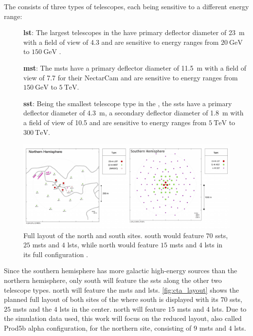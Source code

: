 The \cta{} consists of three types of telescopes, each being sensitive to a different energy range:
\begin{description}
    \item [] \textbf{\gls{lst}}: The largest telescopes in the \cta{} have primary deflector diameter
    of \SI{23}{\meter} with a field of view of \SI{4.3}{\deg} and are sensitive to energy
    ranges from \(\SI{20}{\giga\eV}\) to \(\SI{150}{\giga\eV}\) \cite{cta_specs}.
    \item [] \textbf{\gls{mst}}: The \glspl{mst} have a primary deflector diameter of \SI{11.5}{\meter}
    with a field of view of \SI{7.7}{\deg} for their NectarCam and are sensitive to energy ranges
    from \(\SI{150}{\giga\eV}\) to \(\SI{5}{\tera\eV}\).
    \item [] \textbf{\gls{sst}}: Being the smallest telescope type in the \cta{}, the \glspl{sst}
    have a primary deflector diameter of \SI{4.3}{\meter}, a secondary deflector diameter of
    \SI{1.8}{\meter} with a field of view of \SI{10.5}{\deg} and are sensitive to energy ranges
    from \(\SI{5}{\tera\eV}\) to \(\SI{300}{\tera\eV}\).
\end{description}

\begin{figure}
    \centering
    \includegraphics[width=\textwidth]{graphics/cta_layout.png}
    \caption{Full layout of the \cta{} north and south sites. \cta{} south would feature
    \(\num{70}\) \glspl{sst}, \(\num{25}\) \glspl{mst} and \(\num{4}\) \glspl{lst}, while
    \cta{} north would feature \(\num{15}\) \glspl{mst} and \(\num{4}\) \glspl{lst} in its
    full configuration \cite{cta_layout}.}
    \label{fig:cta_layout}
\end{figure}

Since the southern hemisphere has more galactic high-energy sources than the northern hemisphere,
only \cta{} south will feature the \glspl{sst} along the other two telescope types. \cta{} north
will feature the \glspl{mst} and \glspl{lst}. \autoref{fig:cta_layout} shows the
planned full layout of both sites of the \cta{} where \cta{} south is displayed with its \(\num{70}\)
\glspl{sst}, \(\num{25}\) \glspl{mst} and the \(\num{4}\) \glspl{lst} in the center. \cta{} north
will feature \(\num{15}\) \glspl{mst} and \(\num{4}\) \glspl{lst}. Due to the simulation data used,
this work will focus on the reduced layout, also called  Prod5b alpha
configuration, for the northern site, consisting of \(\num{9}\) \glspl{mst} and \(\num{4}\) \glspl{lst}.